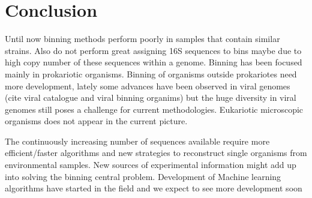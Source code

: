 \documentclass{article}
\begin{document}
\section{Conclusion}
Until now binning methods perform poorly in samples that contain similar strains. Also do not perform great assigning 16S sequences to bins maybe due to high copy number of these sequences within a genome.
Binning has been focused mainly in prokariotic organisms. Binning of organisms outside prokariotes need more development, lately some advances have been observed in viral genomes  (cite viral catalogue and viral binning organims) but the huge diversity in viral genomes still poses a challenge for current methodologies. Eukariotic microscopic organisms does not appear in the current picture. 

The continuously increasing number of sequences available require more efficient/faster algorithms and new strategies to reconstruct single organisms from environmental samples.
New sources of experimental information might add up into solving the binning central problem.
Development of Machine learning algorithms have started in the field and we expect to see more development soon




\end{document}
